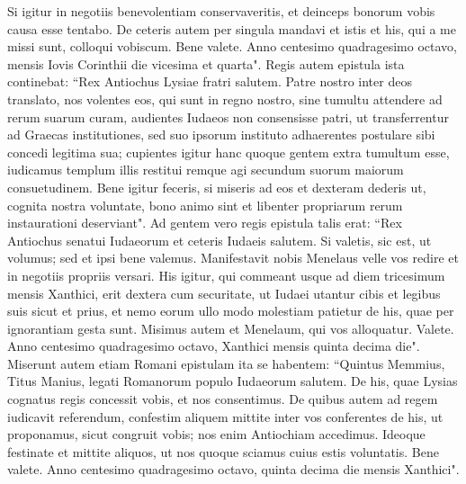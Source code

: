 \begin{biblechapter}
\verse Si igitur in negotiis benevolentiam conservaveritis, et deinceps bonorum vobis causa esse tentabo.  
\verse De ceteris autem per singula mandavi et istis et his, qui a me missi sunt, colloqui vobiscum. 
\verse Bene valete. Anno centesimo quadragesimo octavo, mensis Iovis Corinthii die vicesima et quarta". 
\verse Regis autem epistula ista continebat: “Rex Antiochus Lysiae fratri salutem.  
\verse Patre nostro inter deos translato, nos volentes eos, qui sunt in regno nostro, sine tumultu attendere ad rerum suarum curam, 
\verse audientes Iudaeos non consensisse patri, ut transferrentur ad Graecas institutiones, sed suo ipsorum instituto adhaerentes postulare sibi concedi legitima sua; 
\verse cupientes igitur hanc quoque gentem extra tumultum esse, iudicamus templum illis restitui remque agi secundum suorum maiorum consuetudinem. 
\verse Bene igitur feceris, si miseris ad eos et dexteram dederis ut, cognita nostra voluntate, bono animo sint et libenter propriarum rerum instaurationi deserviant". 
\verse Ad gentem vero regis epistula talis erat: “Rex Antiochus senatui Iudaeorum et ceteris Iudaeis salutem. 
\verse Si valetis, sic est, ut volumus; sed et ipsi bene valemus. 
\verse Manifestavit nobis Menelaus velle vos redire et in negotiis propriis versari. 
\verse His igitur, qui commeant usque ad diem tricesimum mensis Xanthici, erit dextera cum securitate, 
\verse ut Iudaei utantur cibis et legibus suis sicut et prius, et nemo eorum ullo modo molestiam patietur de his, quae per ignorantiam gesta sunt. 
\verse Misimus autem et Menelaum, qui vos alloquatur. 
\verse Valete. Anno centesimo quadragesimo octavo, Xanthici mensis quinta decima die". 
\verse Miserunt autem etiam Romani epistulam ita se habentem: “Quintus Memmius, Titus Manius, legati Romanorum populo Iudaeorum salutem. 
\verse De his, quae Lysias cognatus regis concessit vobis, et nos consentimus. 
\verse De quibus autem ad regem iudicavit referendum, confestim aliquem mittite inter vos conferentes de his, ut proponamus, sicut congruit vobis; nos enim Antiochiam accedimus. 
\verse Ideoque festinate et mittite aliquos, ut nos quoque sciamus cuius estis voluntatis. 
\verse Bene valete. Anno centesimo quadragesimo octavo, quinta decima die mensis Xanthici". 
\end{biblechapter}

